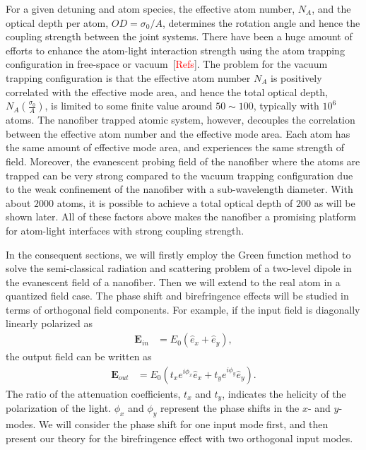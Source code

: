 \documentclass[preprint,aps,pra,onecolumn]{revtex4-1} %
\begin{document}

For a given detuning and atom species, the effective atom number, $N_A$, and the optical depth per atom, $ OD=\sigma_0/A$, determines the rotation angle and hence the coupling strength between the joint systems. There have been a huge amount of efforts to enhance the atom-light interaction strength using the atom trapping configuration in free-space or vacuum~[\textcolor{red}{Refs}]. The problem for the vacuum trapping configuration is that the effective atom number $N_A$ is positively correlated with the effective mode area, and hence the total optical depth, $N_A\left( \frac{\sigma_0}{A}\right)$, is limited to some finite value around $50\sim 100$, typically with $10^6$ atoms. The nanofiber trapped atomic system, however, decouples the correlation between the effective atom number and the effective mode area. Each atom has the same amount of effective mode area, and experiences the same strength of field. Moreover, the evanescent probing field of the nanofiber where the atoms are trapped can be very strong compared to the vacuum trapping configuration due to the weak confinement of the nanofiber with a sub-wavelength diameter. With about $2000$ atoms, it is possible to achieve a total optical depth of $200$ as will be shown later. All of these factors above makes the nanofiber a promising platform for atom-light interfaces with strong coupling strength. 


In the consequent sections, we will firstly employ the Green function method to solve the semi-classical radiation and scattering problem of a two-level dipole in the evanescent field of a nanofiber. Then we will extend to the real atom in a quantized field case. The phase shift and birefringence effects will be studied in terms of orthogonal field components. For example, if the input field is diagonally linearly polarized as
\begin{align}
\mathbf{E}_{in} &= E_0(\hat{e}_x+\hat{e}_y),
\end{align}
the output field can be written as
\begin{align}
\mathbf{E}_{out} &= E_0(t_xe^{i\phi_x}\hat{e}_x+t_ye^{i\phi_y}\hat{e}_y).
\end{align}
The ratio of the attenuation coefficients, $t_x$ and $t_y$, indicates the helicity of the polarization of the light. $\phi_x$ and $\phi_y$ represent the phase shifts in the $x$- and $y$-modes. We will consider the phase shift for one input mode first, and then present our theory for the birefringence effect with two orthogonal input modes. 
\end{document}
